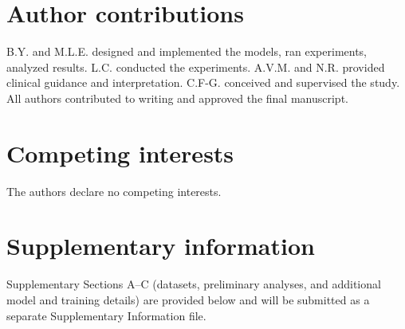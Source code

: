 \documentclass[pdflatex,sn-nature]{sn-jnl}%
\newif\ifhighlight
\newcommand{\rev}[1]{\ifhighlight{\color{blue}{}#1}\else#1\fi}%
\newcommand{\revdel}[1]{\ifhighlight{\color{red}\sout{#1}}\fi}
\theoremstyle{thmstyleone}%
\theoremstyle{thmstyletwo}%
\theoremstyle{thmstylethree}%
\begin{document}
\section*{Author contributions}
B.Y. and M.L.E. designed and implemented the models, ran experiments, analyzed results. L.C. conducted the \revdel{LoRa} experiments. A.V.M. and N.R. provided clinical guidance and interpretation. C.F-G. conceived and supervised the study. All authors contributed to writing and approved the final manuscript.

\section*{Competing interests}
The authors declare no competing interests.



\backmatter

\section*{Supplementary information}
\rev{Supplementary Sections A--C (datasets, preliminary analyses, and additional model and training details) are provided below and will be submitted as a separate Supplementary Information file.}



\end{document}
